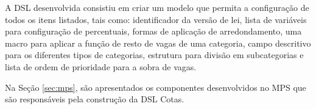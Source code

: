    A \gls{DSL} desenvolvida consistiu em criar um modelo que permita a configuração de todos os itens listados, tais como: identificador da versão de lei, lista de variáveis para configuração de percentuais, formas de aplicação de arredondamento, uma macro para aplicar a função de resto de vagas de uma categoria, campo descritivo para os diferentes tipos de categorias, estrutura para divisão em subcategorias e lista de ordem de prioridade para a sobra de vagas.
   
   
   
    Na Seção \ref{sec:mps}, são apresentados os componentes desenvolvidos no MPS que são responsáveis pela construção da DSL Cotas.
    
   
